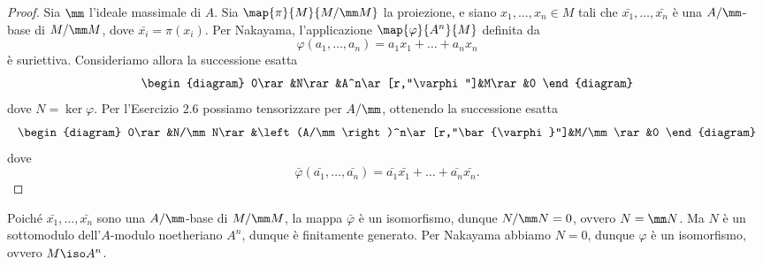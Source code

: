 \documentclass[a4paper]{article}
\begin{document}
\begin{proof}
Sia $\mm$ l'ideale massimale di $A$. Sia $\map{\pi}{M}{M/\mm M}$ la proiezione, e siano $x_1,\ldots,x_n\in M$ tali che $\bar{x_1},\ldots,\bar{x_n}$ è una $A/\mm$-base di $M/\mm M$, dove $\bar{x_i}=\pi(x_i)$. Per Nakayama, l'applicazione $\map{\varphi}{A^n}{M}$ definita da
$$
\varphi(a_1,\ldots,a_n)=a_1x_1+\ldots+a_nx_n
$$
è suriettiva. Consideriamo allora la successione esatta
$$
\begin{diagram}
0\rar&N\rar&A^n\ar[r,"\varphi"]&M\rar&0
\end{diagram}
$$
dove $N=\ker\varphi$. Per l'Esercizio 2.6 possiamo tensorizzare per $A/\mm$, ottenendo la successione esatta
$$
\begin{diagram}
0\rar&N/\mm N\rar&\left(A/\mm\right)^n\ar[r,"\bar{\varphi}"]&M/\mm\rar&0
\end{diagram}
$$
dove
$$
\bar{\varphi}(\bar{a_1},\ldots,\bar{a_n})=\bar{a_1}\bar{x_1}+\ldots+\bar{a_n}\bar{x_n}.
$$
\end{proof}
Poiché $\bar{x_1},\ldots,\bar{x_n}$ sono una $A/\mm$-base di $M/\mm M$, la mappa $\bar\varphi$ è un isomorfismo, dunque $N/\mm N=0$, ovvero $N=\mm N$. Ma $N$ è un sottomodulo dell'$A$-modulo noetheriano $A^n$, dunque è finitamente generato. Per Nakayama abbiamo $N=0$, dunque $\varphi$ è un isomorfismo, ovvero $M\iso A^n$.
\newpage
\end{document}
